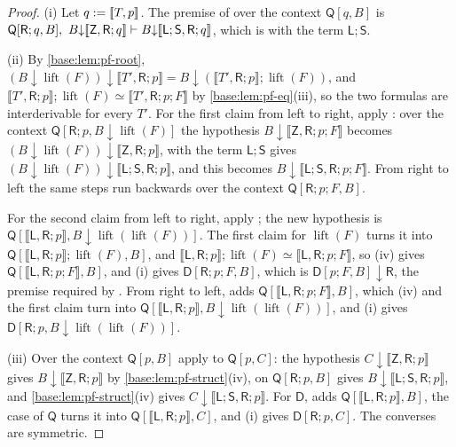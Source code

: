 \begin{proof}
(i) Let $q\mathrel{:=}[\![ T,p]\!]$.  The premise of  over
the context $\mathsf Q[q,B]$ is
$\mathsf Q[\mathsf R;q,B],\ B{\downarrow}\llbracket\mathsf Z,\mathsf R;q\rrbracket
\proves B{\downarrow}\llbracket\mathsf L;\mathsf S,\mathsf R;q\rrbracket$,
which is  with the term $\mathsf L;\mathsf S$.

(ii) By \cref{base:lem:pf-root},
$(B{\downarrow}\operatorname{lift}(F)){\downarrow}\llbracket T',\mathsf R;p\rrbracket
=B{\downarrow}(\llbracket T',\mathsf R;p\rrbracket;\operatorname{lift}(F))$, and
$\llbracket T',\mathsf R;p\rrbracket;\operatorname{lift}(F)\simeq
\llbracket T',\mathsf R;p;F\rrbracket$ by \cref{base:lem:pf-eq}(iii), so the
two formulas are interderivable for every $T'$.  For the first claim from
left to right, apply : over the context
$\mathsf Q[\mathsf R;p,B{\downarrow}\operatorname{lift}(F)]$ the hypothesis
$B{\downarrow}\llbracket\mathsf Z,\mathsf R;p;F\rrbracket$ becomes
$(B{\downarrow}\operatorname{lift}(F)){\downarrow}\llbracket\mathsf Z,\mathsf R;p\rrbracket$,
 with the term $\mathsf L;\mathsf S$ gives
$(B{\downarrow}\operatorname{lift}(F)){\downarrow}\llbracket\mathsf L;\mathsf S,\mathsf R;p\rrbracket$,
and this becomes $B{\downarrow}\llbracket\mathsf L;\mathsf S,\mathsf R;p;F\rrbracket$.
From right to left the same steps run backwards over the context
$\mathsf Q[\mathsf R;p;F,B]$.

For the second claim from left to right, apply ; the new
hypothesis is
$\mathsf Q[\llbracket\mathsf L,\mathsf R;p\rrbracket,
B{\downarrow}\operatorname{lift}(\operatorname{lift}(F))]$.  The first claim
for $\operatorname{lift}(F)$ turns it into
$\mathsf Q[\llbracket\mathsf L,\mathsf R;p\rrbracket;\operatorname{lift}(F),B]$,
and $\llbracket\mathsf L,\mathsf R;p\rrbracket;\operatorname{lift}(F)\simeq
\llbracket\mathsf L,\mathsf R;p;F\rrbracket$, so (iv) gives
$\mathsf Q[\llbracket\mathsf L,\mathsf R;p;F\rrbracket,B]$, and (i) gives
$\mathsf D[\mathsf R;p;F,B]$, which is $\mathsf D[p;F,B]{\downarrow}\mathsf R$,
the premise required by .  From right to left, 
adds $\mathsf Q[\llbracket\mathsf L,\mathsf R;p;F\rrbracket,B]$, which (iv)
and the first claim turn into $\mathsf Q[\llbracket\mathsf L,\mathsf R;p\rrbracket,
B{\downarrow}\operatorname{lift}(\operatorname{lift}(F))]$, and (i) gives
$\mathsf D[\mathsf R;p,B{\downarrow}\operatorname{lift}(\operatorname{lift}(F))]$.

(iii) Over the context $\mathsf Q[p,B]$ apply  to
$\mathsf Q[p,C]$: the hypothesis
$C{\downarrow}\llbracket\mathsf Z,\mathsf R;p\rrbracket$ gives
$B{\downarrow}\llbracket\mathsf Z,\mathsf R;p\rrbracket$ by
\cref{base:lem:pf-struct}(iv),  on
$\mathsf Q[\mathsf R;p,B]$ gives
$B{\downarrow}\llbracket\mathsf L;\mathsf S,\mathsf R;p\rrbracket$, and
\cref{base:lem:pf-struct}(iv) gives
$C{\downarrow}\llbracket\mathsf L;\mathsf S,\mathsf R;p\rrbracket$.  For
$\mathsf D$,  adds $\mathsf Q[\llbracket\mathsf L,\mathsf R;p\rrbracket,B]$,
the case of $\mathsf Q$ turns it into
$\mathsf Q[\llbracket\mathsf L,\mathsf R;p\rrbracket,C]$, and (i) gives
$\mathsf D[\mathsf R;p,C]$.  The converses are symmetric.


\end{proof}
